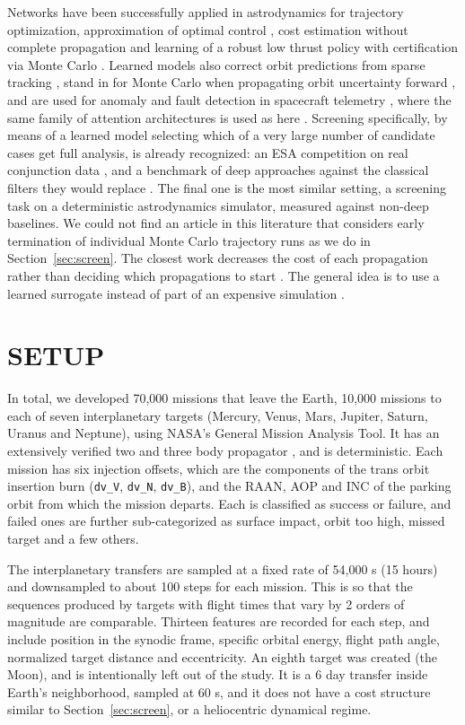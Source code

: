 \documentclass{IEEEtaes}
\begin{document}
Networks have been successfully applied in astrodynamics for trajectory optimization, approximation of optimal control \cite{izzo2019survey,izzo2024,sanchez2018}, cost estimation without complete propagation \cite{li2020deep,izzo2019ml} and learning of a robust low thrust policy with certification via Monte Carlo \cite{zavoli2021}. Learned models also correct orbit predictions from sparse tracking \cite{li2020orbit}, stand in for Monte Carlo when propagating orbit uncertainty forward \cite{zhou2024}, and are used for anomaly and fault detection in spacecraft telemetry \cite{ibrahim2019,naik2020}, where the same family of attention architectures is used as here \cite{jiang2023}. Screening specifically, by means of a learned model selecting which of a very large number of candidate cases get full analysis, is already recognized: an ESA competition on real conjunction data \cite{uriot2020,acciarini2021}, and a benchmark of deep approaches against the classical filters they would replace \cite{stevenson2023}. The final one is the most similar setting, a screening task on a deterministic astrodynamics simulator, measured against non-deep baselines. We could not find an article in this literature that considers early termination of individual Monte Carlo trajectory runs as we do in Section~\ref{sec:screen}. The closest work decreases the cost of each propagation rather than deciding which propagations to start \cite{massari2017,jia2022}. The general idea is to use a learned surrogate instead of part of an expensive simulation \cite{yin2022}.

\section{SETUP}
\label{sec:setup}

In total, we developed 70,000 missions that leave the Earth, 10,000 missions to each of seven interplanetary targets (Mercury, Venus, Mars, Jupiter, Saturn, Uranus and Neptune), using NASA's General Mission Analysis Tool. It has an extensively verified two and three body propagator \cite{hughes2014}, and is deterministic. Each mission has six injection offsets, which are the components of the trans orbit insertion burn (\texttt{dv\_V}, \texttt{dv\_N}, \texttt{dv\_B}), and the RAAN, AOP and INC of the parking orbit from which the mission departs. Each is classified as success or failure, and failed ones are further sub-categorized as surface impact, orbit too high, missed target and a few others.

The interplanetary transfers are sampled at a fixed rate of 54,000 s (15 hours) and downsampled to about 100 steps for each mission. This is so that the sequences produced by targets with flight times that vary by 2 orders of magnitude are comparable. Thirteen features are recorded for each step, and include position in the synodic frame, specific orbital energy, flight path angle, normalized target distance and eccentricity. An eighth target was created (the Moon), and is intentionally left out of the study. It is a 6 day transfer inside Earth's neighborhood, sampled at 60 s, and it does not have a cost structure similar to Section~\ref{sec:screen}, or a heliocentric dynamical regime.
\end{document}
